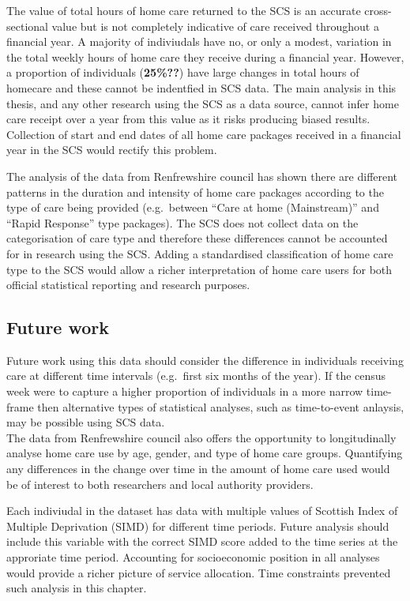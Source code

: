 \documentclass[]{article}
\begin{document}
The value of total hours of home care returned to the SCS is an accurate
cross-sectional value but is not completely indicative of care received
throughout a financial year. A majority of indiviudals have no, or only
a modest, variation in the total weekly hours of home care they receive
during a financial year. However, a proportion of individuals
(\textbf{25\%??}) have large changes in total hours of homecare and
these cannot be indentfied in SCS data. The main analysis in this
thesis, and any other research using the SCS as a data source, cannot
infer home care receipt over a year from this value as it risks
producing biased results. Collection of start and end dates of all home
care packages received in a financial year in the SCS would rectify this
problem.

The analysis of the data from Renfrewshire council has shown there are
different patterns in the duration and intensity of home care packages
according to the type of care being provided (e.g.~between ``Care at
home (Mainstream)'' and ``Rapid Response'' type packages). The SCS does
not collect data on the categorisation of care type and therefore these
differences cannot be accounted for in research using the SCS. Adding a
standardised classification of home care type to the SCS would allow a
richer interpretation of home care users for both official statistical
reporting and research purposes.

\subsection{Future work}\label{subsec:renf-discuss-future}

Future work using this data should consider the difference in
individuals receiving care at different time intervals (e.g.~first six
months of the year). If the census week were to capture a higher
proportion of individuals in a more narrow time-frame then alternative
types of statistical analyses, such as time-to-event anlaysis, may be
possible using SCS data.\\
The data from Renfrewshire council also offers the opportunity to
longitudinally analyse home care use by age, gender, and type of home
care groups. Quantifying any differences in the change over time in the
amount of home care used would be of interest to both researchers and
local authority providers.

Each indiviudal in the dataset has data with multiple values of Scottish
Index of Multiple Deprivation (SIMD) for different time periods. Future
analysis should include this variable with the correct SIMD score added
to the time series at the approriate time period. Accounting for
socioeconomic position in all analyses would provide a richer picture of
service allocation. Time constraints prevented such analysis in this
chapter.
\end{document}
